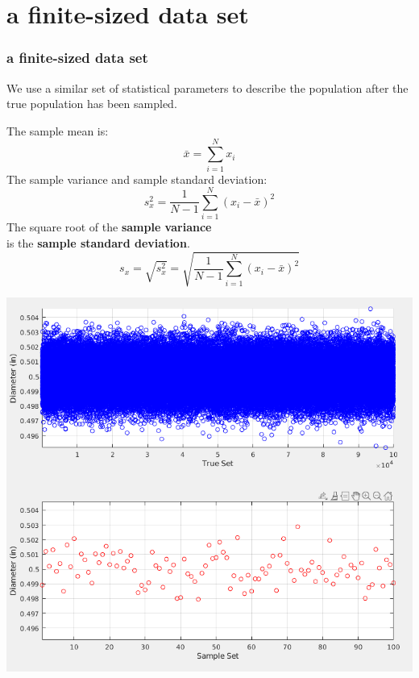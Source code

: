 \documentclass[fleqn]{beamer} %
\newcommand{\sectiontitleIII}{a finite-sized data set}
\begin{document}
\section{\sectiontitleIII}	

	\begin{frame}[label=sectionIII] \small
		\frametitle{\sectiontitleIII}    
		
		We use a similar set of statistical parameters to describe the population after the true population has been sampled.
		
		\begin{multicols}{2} \tiny
		The sample mean is:\\
		\[ \bar{x}=\sum\limits_{i=1}^{N}x_i \]
		The sample variance and sample standard deviation:\\
		\[ s_x^2=\frac{1}{N-1}\sum\limits_{i=1}^{N}\left(x_i-\bar{x}\right)^2 \]
		The square root of the {\bf \B sample variance} \\
		is the {\bf \PR sample standard deviation}. \\
		\[s_x=\sqrt{s_x^2}=\sqrt{\frac{1}{N-1}\sum\limits_{i=1}^{N}\left(x_i-\bar{x}\right)^2}\]

		\hspace*{0cm}\includegraphics[scale=.20]{topic4_fig1.png}		
		
		\end{multicols}

	\end{frame}
	
\end{document}
